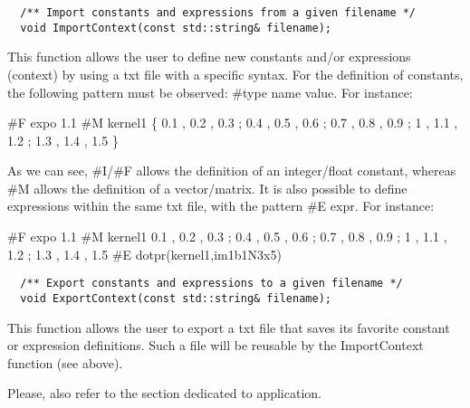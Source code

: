 \begin{verbatim}
  /** Import constants and expressions from a given filename */
  void ImportContext(const std::string& filename);
\end{verbatim}

This function allows the user to define new constants and/or expressions (context) by using a txt file with a specific syntax.
For the definition of constants, the following pattern must be observed:
\newline  \#type name value. 
\newline For instance:


\#F expo 1.1 \newline 
\#M kernel1 \{ 0.1 , 0.2 , 0.3 ; 0.4 , 0.5 , 0.6 ; 0.7 , 0.8 , 0.9 ; 1 , 1.1 , 1.2 ; 1.3 , 1.4 , 1.5 \} \newline

As we can see,  \#I/\#F allows the definition of an integer/float constant, 
whereas \#M allows the definition of a vector/matrix. It is also possible 
to define expressions within the same txt file, with the pattern \#E expr. 
For instance:

\#F expo 1.1 \newline 
\#M kernel1 { 0.1 , 0.2 , 0.3 ; 0.4 , 0.5 , 0.6 ; 0.7 , 0.8 , 0.9 ; 1 , 1.1 , 1.2 ; 1.3 , 1.4 , 1.5 } \newline 
\#E dotpr(kernel1,im1b1N3x5) \newline

\begin{verbatim}
  /** Export constants and expressions to a given filename */
  void ExportContext(const std::string& filename);
\end{verbatim}

This function allows the user to export a txt file that saves its 
favorite constant or expression definitions. Such a file will be 
reusable by the ImportContext function (see above).

Please, also refer to the section dedicated to  application.



